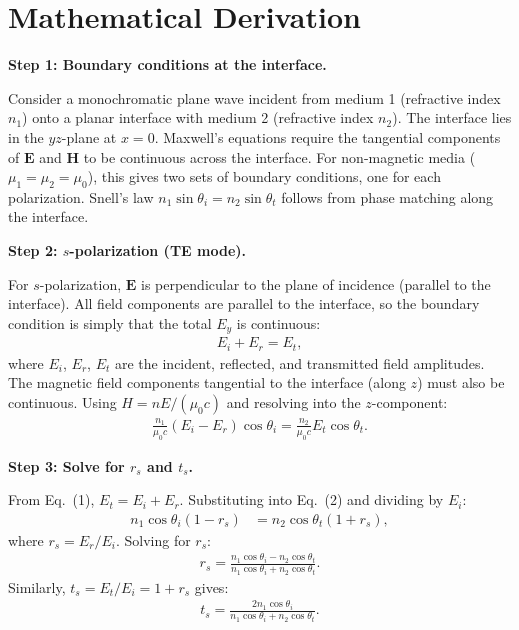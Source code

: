 \section*{Mathematical Derivation}

\textbf{Step 1: Boundary conditions at the interface.}

Consider a monochromatic plane wave incident from medium 1 (refractive index $n_1$) onto a planar interface with medium 2 (refractive index $n_2$). The interface lies in the $yz$-plane at $x = 0$. Maxwell's equations require the tangential components of $\mathbf{E}$ and $\mathbf{H}$ to be continuous across the interface. For non-magnetic media ($\mu_1 = \mu_2 = \mu_0$), this gives two sets of boundary conditions, one for each polarization. Snell's law $n_1\sin\theta_i = n_2\sin\theta_t$ follows from phase matching along the interface.

\textbf{Step 2: $s$-polarization (TE mode).}

For $s$-polarization, $\mathbf{E}$ is perpendicular to the plane of incidence (parallel to the interface). All field components are parallel to the interface, so the boundary condition is simply that the total $E_y$ is continuous:
\begin{align}
E_i + E_r = E_t, \tag{1}
\end{align}
where $E_i$, $E_r$, $E_t$ are the incident, reflected, and transmitted field amplitudes. The magnetic field components tangential to the interface (along $z$) must also be continuous. Using $H = nE/(\mu_0 c)$ and resolving into the $z$-component:
\begin{align}
\frac{n_1}{\mu_0 c}(E_i - E_r)\cos\theta_i = \frac{n_2}{\mu_0 c}E_t\cos\theta_t. \tag{2}
\end{align}

\textbf{Step 3: Solve for $r_s$ and $t_s$.}

From Eq.\ (1), $E_t = E_i + E_r$. Substituting into Eq.\ (2) and dividing by $E_i$:
\begin{align}
n_1\cos\theta_i(1 - r_s) &= n_2\cos\theta_t(1 + r_s),
\end{align}
where $r_s = E_r/E_i$. Solving for $r_s$:
\begin{align}
r_s = \frac{n_1\cos\theta_i - n_2\cos\theta_t}{n_1\cos\theta_i + n_2\cos\theta_t}.
\end{align}
Similarly, $t_s = E_t/E_i = 1 + r_s$ gives:
\begin{align}
t_s = \frac{2n_1\cos\theta_i}{n_1\cos\theta_i + n_2\cos\theta_t}.
\end{align}

